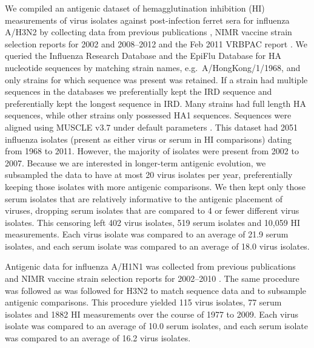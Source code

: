 \documentclass[11pt,oneside,letterpaper]{article}
\begin{document}
We compiled an antigenic dataset of hemagglutination inhibition (HI) measurements of virus isolates against post-infection ferret sera for influenza A/H3N2 by collecting data from previous publications \cite{Hay01,Smith04,Russell08,Barr10}, NIMR vaccine strain selection reports for 2002 and 2008--2012 \cite{NIMR02,NIMRMarch08,NIMRFeb09,NIMRFeb10,NIMRSep10,NIMRSep11,NIMRFeb12} and the Feb 2011 VRBPAC report \cite{Cox11FDA}.
We queried the Influenza Research Database \cite{IRD} and the EpiFlu Database \cite{GISAID} for HA nucleotide sequences by matching strain names, e.g.\ A/HongKong/1/1968, and only strains for which sequence was present was retained.
If a strain had multiple sequences in the databases we preferentially kept the IRD sequence and preferentially kept the longest sequence in IRD.
Many strains had full length HA sequences, while other strains only possessed HA1 sequences.
Sequences were aligned using MUSCLE v3.7 under default parameters \cite{MUSCLE}.
This dataset had 2051 influenza isolates (present as either virus or serum in HI comparisons) dating from 1968 to 2011. 
However, the majority of isolates were present from 2002 to 2007. 
Because we are interested in longer-term antigenic evolution, we subsampled the data to have at most 20 virus isolates per year, preferentially keeping those isolates with more antigenic comparisons. 
We then kept only those serum isolates that are relatively informative to the antigenic placement of viruses, dropping serum isolates that are compared to 4 or fewer different virus isolates.
This censoring left 402 virus isolates, 519 serum isolates and 10,059 HI measurements. 
Each virus isolate was compared to an average of 21.9 serum isolates, and each serum isolate was compared to an average of 18.0 virus isolates.

Antigenic data for influenza A/H1N1 was collected from previous publications \cite{Kendal78,Webster79,Nakajima79,Nakajima81,Chakraverty82,Pereira82,Chakraverty86,Cox83,Daniels85,Raymond86,Stevens87,Donatelli93,Hay01,Daum02,McDonald07,Barr10} and NIMR vaccine strain selection reports for 2002--2010 \cite{NIMR02,NIMR03,NIMR04,NIMRFeb05,NIMRSep05,NIMRMarch06,NIMRSep06,NIMRMarch07,NIMRSep07,NIMRMarch08,NIMRSep08,NIMRFeb09,NIMRFeb10}.
The same procedure was followed as was followed for H3N2 to match sequence data and to subsample antigenic comparisons.
This procedure yielded 115 virus isolates, 77 serum isolates and 1882 HI measurements over the course of 1977 to 2009.
Each virus isolate was compared to an average of 10.0 serum isolates, and each serum isolate was compared to an average of 16.2 virus isolates.
\end{document}
